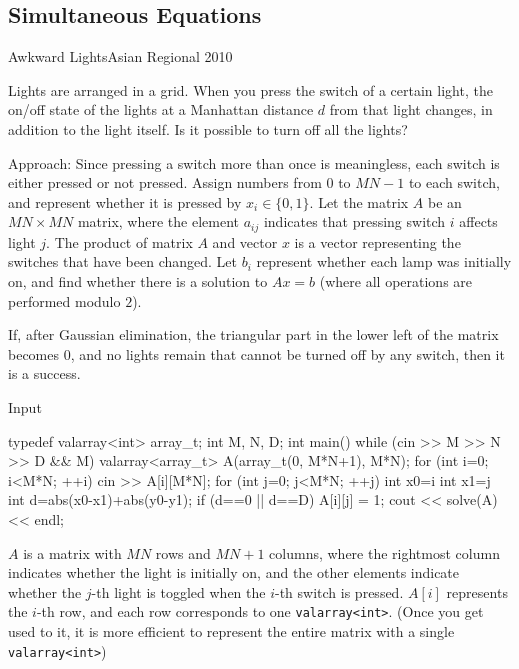 \begin{versionbeta}
\subsection{Simultaneous Equations}

\begin{pbox}{Awkward Lights}{Asian Regional 2010}

Lights are arranged in a grid.
When you press the switch of a certain light, the on/off state of the lights at a Manhattan distance $d$ from that light changes, in addition to the light itself. Is it possible to turn off all the lights?


\end{pbox}

Approach: Since pressing a switch more than once is meaningless, each switch is either pressed or not pressed. Assign numbers from $0$ to $MN-1$ to each switch, and represent whether it is pressed by $x_i \in \{0,1\}$.
Let the matrix $A$ be an $MN \times MN$ matrix, where the element $a_{ij}$ indicates that pressing switch $i$ affects light $j$.
The product of matrix $A$ and vector $x$ is a vector representing the switches that have been changed.
Let $b_i$ represent whether each lamp was initially on, and find whether there is a solution to $Ax = b$ (where all operations are performed modulo $2$).

If, after Gaussian elimination, the triangular part in the lower left of the matrix becomes 0, and no lights remain that cannot be turned off by any switch, then it is a success.

Input
\begin{cbox}
typedef valarray<int> array_t;
int M, N, D;
int main() {
    while (cin >> M >> N >> D && M) {
        valarray<array_t> A(array_t(0, M*N+1), M*N);
        for (int i=0; i<M*N; ++i) {
            cin >> A[i][M*N];
            for (int j=0; j<M*N; ++j) {
                int x0=i%
                int x1=j%
                int d=abs(x0-x1)+abs(y0-y1);
                if (d==0 || d==D) A[i][j] = 1;
            }
        }
        cout << solve(A) << endl;
    }
} 
\end{cbox}

$A$ is a matrix with $MN$ rows and $MN+1$ columns, where the rightmost column indicates whether the light is initially on, and the other elements indicate whether the $j$-th light is toggled when the $i$-th switch is pressed.
$A[i]$ represents the $i$-th row, and each row corresponds to one \texttt{valarray<int>}.
(Once you get used to it, it is more efficient to represent the entire matrix with a single \texttt{valarray<int>})


\end{versionbeta}

